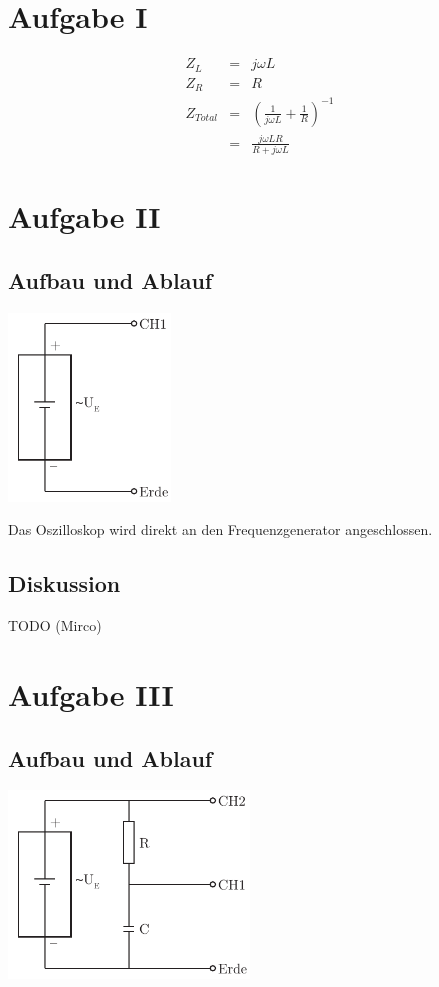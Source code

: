 \documentclass[12pt,a4paper]{article}
\begin{document}
\section*{Aufgabe I}
\begin{eqnarray*}
Z_L & = & j \omega L \\
Z_R & = & R \\
Z_{Total} & = & \left( \frac{1}{j \omega L} + \frac{1}{R} \right) ^{-1} \\
& = & \frac{j \omega L R}{R + j \omega L}
\end{eqnarray*}


\section*{Aufgabe II}
\subsection*{Aufbau und Ablauf}
\includegraphics[height=5cm]{illustration2.pdf}

Das Oszilloskop wird direkt an den Frequenzgenerator angeschlossen.

\subsection*{Diskussion}
TODO (Mirco)


\section*{Aufgabe III}
\subsection*{Aufbau und Ablauf}
\includegraphics[height=5cm]{illustration3.pdf}
\end{document}
